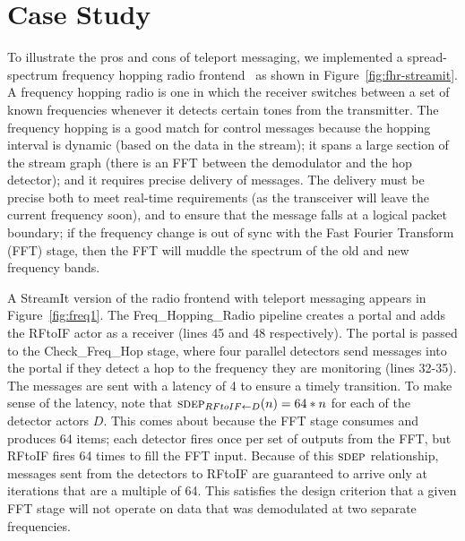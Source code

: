 %

\newpage
\section{Case Study}
\label{sec:casestudy}



To illustrate the pros and cons of teleport messaging, we implemented
a spread-spectrum frequency hopping radio frontend~\cite{harada02} as
shown in Figure~\ref{fig:fhr-streamit}.  A frequency hopping radio is
one in which the receiver switches between a set of known frequencies
whenever it detects certain tones from the transmitter.  The
frequency hopping is a good match for control messages because the
hopping interval is dynamic (based on the data in the stream); it
spans a large section of the stream graph (there is an FFT between the
demodulator and the hop detector); and it requires precise delivery of
messages.  The delivery must be precise both to meet real-time
requirements (as the transceiver will leave the current frequency
soon), and to ensure that the message falls at a logical packet
boundary; if the frequency change is out of sync with the Fast Fourier
Transform (FFT) stage, then the FFT will muddle the spectrum of the
old and new frequency bands.

A StreamIt version of the radio frontend with teleport messaging
appears in Figure~\ref{fig:freq1}.  The Freq\_Hopping\_Radio pipeline
creates a portal and adds the RFtoIF actor as a receiver (lines 45 and
48 respectively).  The portal is passed to the Check\_Freq\_Hop stage,
where four parallel detectors send messages into the portal if they
detect a hop to the frequency they are monitoring (lines 32-35).  The
messages are sent with a latency of 4 to ensure a timely transition.
To make sense of the latency, note that $\sdepf{RFtoIF}{D}(n) = 64*n$
for each of the detector actors $D$.  This comes about because the FFT
stage consumes and produces 64 items; each detector fires once per set
of outputs from the FFT, but RFtoIF fires 64 times to fill the FFT
input.  Because of this $\textsc{sdep}$ relationship, messages sent from the
detectors to RFtoIF are guaranteed to arrive only at iterations that
are a multiple of 64.  This satisfies the design criterion that a
given FFT stage will not operate on data that was demodulated at two
separate frequencies.

